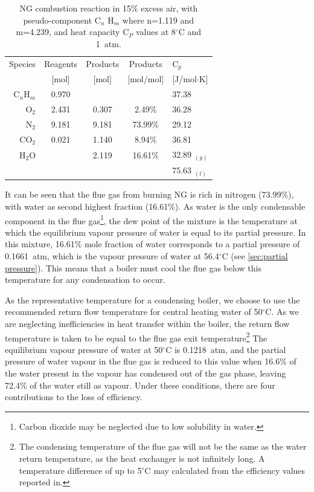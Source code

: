 \documentclass[5p]{elsarticle} %
\begin{document}
\begin{small}
\begin{table}[ht]
    \centering
    \begin{tabular}{r|ccc|l}
         Species & Reagents & Products & Products & C$_p$ \\
         & {\small[mol]} & {\small[mol]} & {\small[mol/mol]} & {\small[J/mol$\cdot$K]} \\
         \hline
         C$_{n}$H$_{m}$ & 0.970 & & & 37.38 \\
         O$_2$ & 2.431 & 0.307 & 2.49\% & 36.28 \\
         N$_2$ & 9.181 & 9.181 & 73.99\% & 29.12 \\
         CO$_2$ & 0.021 & 1.140 & 8.94\% & 36.81 \\
         H$_2$O & & 2.119 & 16.61\% & 32.89 $_{(g)}$ \\
          & &  &  & 75.63 $_{(l)}$ \\
    \end{tabular}
    \caption{NG combustion reaction in 15\% excess air, with pseudo-component C$_{n}$ H$_{m}$ where n=1.119 and m=4.239, and heat capacity C$_P$ values\citep{Huber2022} at 8$^\circ$C and 1~atm.}
    \label{tab:NTSgcombustion}
\end{table}
\end{small}

It can be seen that the flue gas from burning NG is rich in nitrogen (73.99\%), with water as second highest fraction (16.61\%).
As water is the only condensable component in the flue gas\footnote{
Carbon dioxide may be neglected due to low solubility in water\citep{Zhao2023}.
}, the dew point of the mixture is the temperature at which the equilibrium vapour pressure of water is equal to its partial pressure\citep{Perry2008}. 
In this mixture, 16.61\% mole fraction of water corresponds to a partial pressure of 0.1661~atm, which is the vapour pressure of water\citep{Perry2008} at 56.4$^{\circ}$C (see \ref{sec:partial pressure}).
This means that a boiler must cool the flue gas below this temperature for any condensation to occur. 

As the representative temperature for a condensing boiler, we choose to use the recommended return flow temperature for central heating water of 50$^{\circ}$C\citep{BEIS-Kiwa2021}. 
As we are neglecting inefficiencies in heat transfer within the boiler, the return flow temperature is taken to be equal to the flue gas exit temperature\footnote{
The condensing temperature of the flue gas will not be the same as the water return temperature, as the heat exchanger is not infinitely long. A temperature difference of up to 5$^{\circ}$C may calculated from the efficiency values reported in\citep{saty2018,DESNZ2023b}.}
The equilibrium vapour pressure of water at 50$^{\circ}$C is 0.1218~atm, and the partial pressure of water vapour in the flue gas is reduced to this value when 16.6\% of the water present in the vapour has condensed out of the gas phase, leaving 72.4\% of the water still as vapour.
Under these conditions, there are four contributions to the loss of efficiency.
\end{document}
